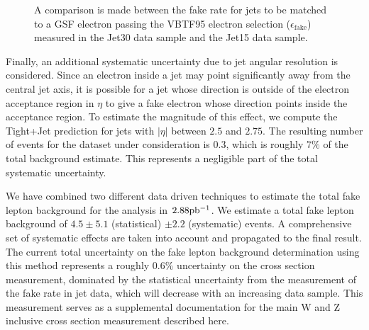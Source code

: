 \documentclass{cmspaper}
\begin{document}
\begin{figure}[htb]
  \begin{center}
    \caption{A comparison is made between the fake rate for jets to be matched to a GSF electron passing the VBTF95 electron selection ($\epsilon_{\mathrm{fake}}$) measured in the Jet30 data sample and the Jet15 data sample.}
    \label{fig:JetFakeRateJetTriggerSystematics}
  \end{center}
\end{figure}


Finally, an additional systematic uncertainty due to jet angular resolution is considered. Since an electron inside a jet may point significantly away from the central jet axis, it is possible for a jet whose direction is outside of the electron acceptance region in $\eta$ to give a fake electron whose direction points inside the acceptance region. To estimate the magnitude of this effect, we compute the Tight+Jet prediction for jets with $|\eta|$ between $2.5$ and $2.75$. The resulting number of events for the dataset under consideration is $0.3$, which is roughly $7\%$ of the total background estimate. This represents a negligible part of the total systematic uncertainty. 


We have combined two different data driven techniques to estimate the total fake lepton background for the \Z\To\EE analysis in $2.88\mathrm{pb^{-1}}$. We estimate a total fake lepton background of $4.5 \pm 5.1$ (statistical) $\pm 2.2$ (systematic) events. A comprehensive set of systematic effects are taken into account and propagated to the final result. The current total uncertainty on the fake lepton background determination using this method represents a roughly $0.6\%$ uncertainty on the \Z\To\EE cross section measurement, dominated by the statistical uncertainty from the measurement of the fake rate in jet data, which will decrease with an increasing data sample. This measurement serves as a supplemental documentation for the main W and Z inclusive cross section measurement described here\cite{UpdatedCrossSectionNote}.
\end{document}
